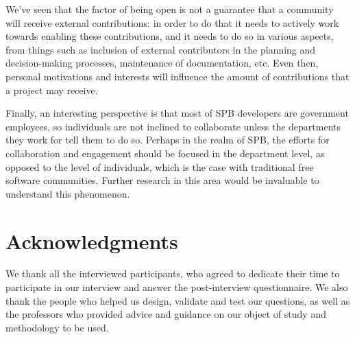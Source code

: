 \documentclass{sigchi}
\begin{document}
We've seen that the factor of being open is not a guarantee that a community will receive external contributions: in order to do that it needs to actively work towards enabling these contributions, and it needs to do so in various aspects, from things such as inclusion of external contributors in the planning and decision-making processes, maintenance of documentation, etc. Even then, personal motivations and interests will influence the amount of contributions that a project may receive.

Finally, an interesting perspective is that most of SPB developers are government employees, so individuals are not inclined to collaborate unless the departments they work for tell them to do so. Perhaps in the realm of SPB, the efforts for collaboration and engagement should be focused in the department level, as opposed to the level of individuals, which is the case with traditional free software communities. Further research in this area would be invaluable to understand this phenomenon. 

\section{Acknowledgments}

We thank all the interviewed participants, who agreed to dedicate their time to participate in our interview and answer the post-interview questionnaire. We also thank the people who helped us design, validate and test our questions, as well as the professors who provided advice and guidance on our object of study and methodology to be used.


%
%
%
%
%
\balance{}



\end{document}
